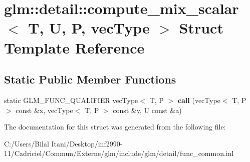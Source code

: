 \hypertarget{structglm_1_1detail_1_1compute__mix__scalar}{}\section{glm\+:\+:detail\+:\+:compute\+\_\+mix\+\_\+scalar$<$ T, U, P, vec\+Type $>$ Struct Template Reference}
\label{structglm_1_1detail_1_1compute__mix__scalar}
\subsection*{Static Public Member Functions}
\begin{DoxyCompactItemize}
\item 
static G\+L\+M\+\_\+\+F\+U\+N\+C\+\_\+\+Q\+U\+A\+L\+I\+F\+I\+ER vec\+Type$<$ T, P $>$ {\bfseries call} (vec\+Type$<$ T, P $>$ const \&x, vec\+Type$<$ T, P $>$ const \&y, U const \&a)\hypertarget{structglm_1_1detail_1_1compute__mix__scalar_a15fb89e5dac67f6645419fd7eaebdc5f}{}\label{structglm_1_1detail_1_1compute__mix__scalar_a15fb89e5dac67f6645419fd7eaebdc5f}

\end{DoxyCompactItemize}


The documentation for this struct was generated from the following file\+:\begin{DoxyCompactItemize}
\item 
C\+:/\+Users/\+Bilal Itani/\+Desktop/inf2990-\/11/\+Cadriciel/\+Commun/\+Externe/glm/include/glm/detail/func\+\_\+common.\+inl\end{DoxyCompactItemize}
